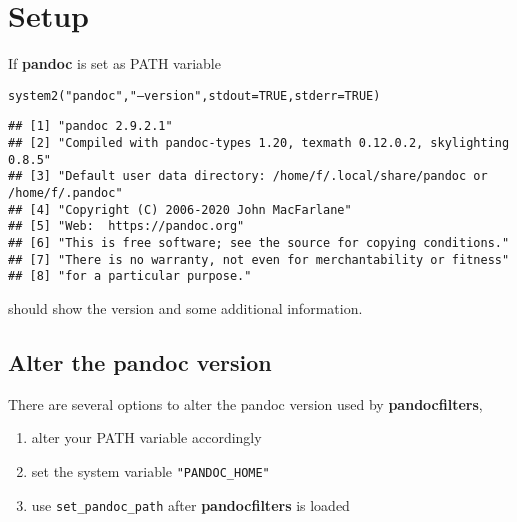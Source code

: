 \documentclass[a4paper]{article}\usepackage[]{graphicx}\usepackage[]{color}
\makeatletter
\newcommand{\hlnum}[1]{\textcolor[rgb]{0,0,0}{#1}}%
\newcommand{\hlstr}[1]{\textcolor[rgb]{0.741,0.553,0.545}{#1}}%
\newcommand{\hlstd}[1]{\textcolor[rgb]{0,0,0}{#1}}%
\newcommand{\hlkwc}[1]{\textcolor[rgb]{0,0,1}{#1}}%
\newcommand{\hlkwd}[1]{\textcolor[rgb]{0,0,0}{#1}}%
\newenvironment{kframe}{%
 \def\at@end@of@kframe{}%
 \ifinner\ifhmode%
  \def\at@end@of@kframe{\end{minipage}}%
  \begin{minipage}{\columnwidth}%
 \fi\fi%
 \def\FrameCommand##1{\hskip\@totalleftmargin \hskip-\fboxsep
 \colorbox{shadecolor}{##1}\hskip-\fboxsep
     \hskip-\linewidth \hskip-\@totalleftmargin \hskip\columnwidth}%
 \MakeFramed {\advance\hsize-\width
   \@totalleftmargin\z@ \linewidth\hsize
   \@setminipage}}%
 {\par\unskip\endMakeFramed%
 \at@end@of@kframe}
\newenvironment{knitrout}{}{} %
\newcommand{\pkg}[1]{\textbf{#1}}
\newcommand{\code}[1]{\texttt{#1}}
\makeatother
\begin{document}
\section{Setup}
If \pkg{pandoc} is set as PATH variable
\begin{knitrout}
\color{fgcolor}\begin{kframe}
\begin{alltt}
\hlkwd{system2}\hlstd{(}\hlstr{"pandoc"}\hlstd{,} \hlstr{"--version"}\hlstd{,} \hlkwc{stdout} \hlstd{=} \hlnum{TRUE}\hlstd{,} \hlkwc{stderr} \hlstd{=} \hlnum{TRUE}\hlstd{)}
\end{alltt}
\begin{verbatim}
## [1] "pandoc 2.9.2.1"                                                             
## [2] "Compiled with pandoc-types 1.20, texmath 0.12.0.2, skylighting 0.8.5"       
## [3] "Default user data directory: /home/f/.local/share/pandoc or /home/f/.pandoc"
## [4] "Copyright (C) 2006-2020 John MacFarlane"                                    
## [5] "Web:  https://pandoc.org"                                                   
## [6] "This is free software; see the source for copying conditions."              
## [7] "There is no warranty, not even for merchantability or fitness"              
## [8] "for a particular purpose."
\end{verbatim}
\end{kframe}
\end{knitrout}

should show the version and some additional information.

\subsection{Alter the pandoc version}
There are several options to alter the pandoc version used by 
\pkg{pandocfilters},
\begin{enumerate}
    \item alter your PATH variable accordingly
    \item set the system variable \code{"PANDOC\_HOME"}
    \item use \code{set\_pandoc\_path} after \pkg{pandocfilters} is loaded
\end{enumerate}
\end{document}
